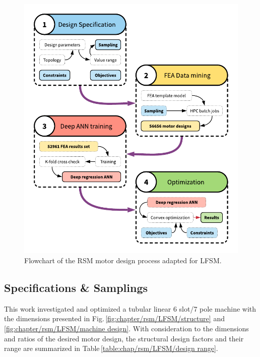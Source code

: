     
        \begin{figure}
            \centering
            \includegraphics[width=4.5in]{chap4/images2/LFSM_design_process.pdf}
            \caption{Flowchart of the RSM motor design process adapted for \acs{LFSM}.}
            \label{fig:chapter/rsm/LFSM/design process}
        \end{figure}
    
    
        \subsection{Specifications \& Samplings}    \label{Chapter:RSM/LFSM/spec}
        
        
            This work investigated and optimized a tubular linear 6 slot/7 pole machine with the dimensions presented in Fig.\,\ref{fig:chapter/rsm/LFSM/structure} and \,\ref{fig:chapter/rsm/LFSM/machine design}. With consideration to the dimensions and ratios of the desired motor design, the structural design factors and their range are summarized in Table\,\ref{table:chap/rsm/LFSM/design range}. 
            

